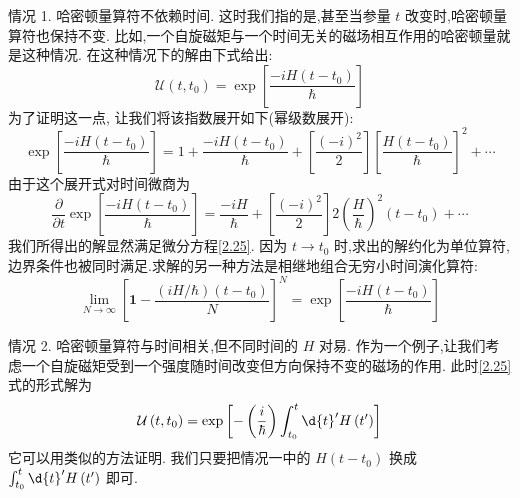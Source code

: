 情况 1. 哈密顿量算符不依赖时间. 这时我们指的是,甚至当参量 $t$ 改变时,哈密顿量算符也保持不变. 比如,一个自旋磁矩与一个时间无关的磁场相互作用的哈密顿量就是这种情况. 在这种情况下的解由下式给出:
\begin{equation}
	\mathcal{U}\left( {t,{t}_{0}}\right) = \exp \left\lbrack \frac{-{iH}\left( {t - {t}_{0}}\right) }{\hbar }\right\rbrack
\end{equation}
为了证明这一点, 让我们将该指数展开如下(幂级数展开):
\begin{equation}
	\exp \left\lbrack \frac{-{iH}\left( {t - {t}_{0}}\right) }{\hbar }\right\rbrack = 1 + \frac{-{iH}\left( {t - {t}_{0}}\right) }{\hbar } + \left\lbrack \frac{{\left( -i\right) }^{2}}{2}\right\rbrack {\left\lbrack \frac{H\left( {t - {t}_{0}}\right) }{\hbar }\right\rbrack }^{2} + \cdots
\end{equation}
由于这个展开式对时间微商为
\begin{equation}
	\frac{\partial }{\partial t}\exp \left\lbrack \frac{-{iH}\left( {t - {t}_{0}}\right) }{\hbar }\right\rbrack = \frac{-{iH}}{\hbar } + \left\lbrack \frac{{\left( -i\right) }^{2}}{2}\right\rbrack 2{\left( \frac{H}{\hbar }\right) }^{2}\left( {t - {t}_{0}}\right) + \cdots
\end{equation}
我们所得出的解显然满足微分方程\ref{2.25}. 因为 $t \rightarrow {t}_{0}$ 时,求出的解约化为单位算符, 边界条件也被同时满足.求解的另一种方法是相继地组合无穷小时间演化算符:
\begin{equation}
	\mathop{\lim }\limits_{{N \rightarrow \infty }}{\left\lbrack \textbf{1} - \frac{\left( {{iH}/\hbar }\right) \left( {t - {t}_{0}}\right) }{N}\right\rbrack }^{N} = \exp \left\lbrack \frac{-{iH}\left( {t - {t}_{0}}\right) }{\hbar }\right\rbrack
\end{equation}

情况 2. 哈密顿量算符与时间相关,但不同时间的 $H$ 对易. 作为一个例子,让我们考虑一个自旋磁矩受到一个强度随时间改变但方向保持不变的磁场的作用. 此时\ref{2.25}式的形式解为
\begin{equation}
	\mathcal{U}\left( {t,{t}_{0}}\right) = \exp \left\lbrack {-\left( \frac{i}{\hbar }\right) \int_{{t}_{0}}^{t}\d{t}^{\prime }H\left( {t}^{\prime }\right) }\right\rbrack
\end{equation}
它可以用类似的方法证明. 我们只要把情况一中的 $H\left( {t - {t}_{0}}\right)$ 换成 $\int_{{t}_{0}}^{t}\d{t}^{\prime }H\left( {t}^{\prime }\right)$ 即可.

